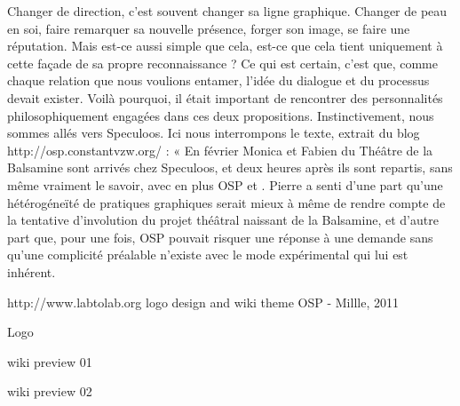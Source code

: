 \subject{Visual identity for the Balsamine theatre.}


Changer de direction, c'est souvent changer sa ligne graphique. Changer
de peau en soi, faire remarquer sa nouvelle présence, forger son image,
se faire une réputation. Mais est-ce aussi simple que cela, est-ce que
cela tient uniquement à cette façade de sa propre reconnaissance ? Ce
qui est certain, c'est que, comme chaque relation que nous voulions
entamer, l'idée du dialogue et du processus devait exister. Voilà
pourquoi, il était important de rencontrer des personnalités
philosophiquement engagées dans ces deux propositions. Instinctivement,
nous sommes allés vers Speculoos. Ici nous interrompons le texte,
extrait du blog http://osp.constantvzw.org/ : « En février Monica et
Fabien du Théâtre de la Balsamine sont arrivés chez Speculoos, et deux
heures après ils sont repartis, sans même vraiment le savoir, avec en
plus OSP et . Pierre a senti d'une part qu'une hétérogéneïté de
pratiques graphiques serait mieux à même de rendre compte de la
tentative d'involution du projet théâtral naissant de la Balsamine, et
d'autre part que, pour une fois, OSP pouvait risquer une réponse à une
demande sans qu'une complicité préalable n'existe avec le mode
expérimental qui lui est inhérent.

{}
{}
{}
{}




\subject{LABtoLAB}


http://www.labtolab.org logo design and wiki theme OSP - Millle, 2011


Logo


wiki preview 01


wiki preview 02




\subject{Constant Variable}

